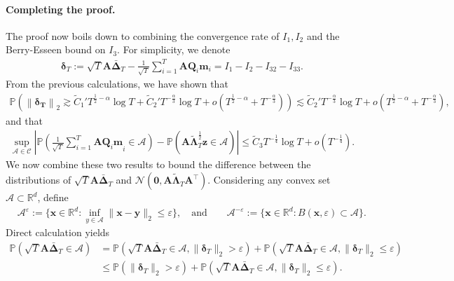 \paragraph{Completing the proof.} 
The proof now boils down to combining the convergence rate of $I_1,I_2$ and the Berry-Esseen bound on $I_3$. For simplicity, we denote
\begin{align*}
\bm{\delta}_T := \sqrt{T} \bm{A}\bar{\bm{\Delta}}_T - \frac{1}{\sqrt{T}}\sum_{i=1}^T\bm{AQ}_i{\bm{m}}_i = I_1 - I_2 - I_{32} - I_{33}.
\end{align*}
From the previous calculations, we have shown that
\begin{align*}
\mathbb{P}\left(\left\|\bm{\delta_T} \right\|_2 \gtrsim \widetilde{C}_1'T^{\frac{1}{2}-\alpha}\log T + \widetilde{C}_2'T^{-\frac{\alpha}{3}}\log T + o(T^{\frac{1}{2}-\alpha} + T^{-\frac{\alpha}{3}})\right)
 \lesssim \widetilde{C}_2'T^{-\frac{\alpha}{3}}\log T + o(T^{\frac{1}{2}-\alpha} + T^{-\frac{\alpha}{3}}),
\end{align*}
and that
\begin{align*}
\sup_{\mathcal{A} \in \mathscr{C}}\left|\mathbb{P}\left(\frac{1}{\sqrt{T}}\sum_{i=1}^T{\bm{AQ}_i\bm{m}}_i\in \mathcal{A}\right) - \mathbb{P}(\bm{A}\widetilde{\bm{\Lambda}}_T^{ \frac{1}{2}}\bm{z} \in \mathcal{A})\right| \leq \widetilde{C}_3 T^{-\frac{1}{4}}{\log T} + o(T^{-\frac{1}{4}}).
\end{align*}
We now combine these two results to bound the difference between the distributions of $\sqrt{T} \bm{A}\bar{\bm{\Delta}}_T$ and $\mathcal{N}(\bm{0},\bm{A}\widetilde{\bm{\Lambda}}_T\bm{A}^\top)$. Considering any convex set $\mathcal{A} \subset \mathbb{R}^d$, define
\begin{align*}
&\mathcal{A}^{\varepsilon} := \{\bm{x} \in \mathbb{R}^d: \inf_{y \in \mathcal{A}} \|\bm{x} - \bm{y}\|_2 \leq \varepsilon\}, \quad \text{and}  \qquad \mathcal{A}^{-\varepsilon}:=\{\bm{x} \in \mathbb{R}^d: B(\bm{x},\varepsilon) \subset \mathcal{A}\}. 
\end{align*}
Direct calculation yields
\begin{align*}
\mathbb{P}(\sqrt{T}\bm{A}\bar{\bm{\Delta}}_T \in \mathcal{A}) &= \mathbb{P}(\sqrt{T}\bm{A}\bar{\bm{\Delta}}_T \in \mathcal{A},\|\bm{\delta}_T\|_2 > \varepsilon) + \mathbb{P}(\sqrt{T}\bm{A}\bar{\bm{\Delta}}_T \in \mathcal{A},\|\bm{\delta}_T\|_2 \leq \varepsilon) \\ 
&\leq \mathbb{P}(\|\bm{\delta}_T\|_2 > \varepsilon) + \mathbb{P}(\sqrt{T}\bm{A}\bar{\bm{\Delta}}_T \in \mathcal{A},\|\bm{\delta}_T\|_2 \leq \varepsilon).
\end{align*}
